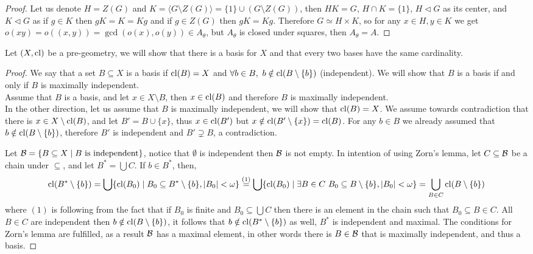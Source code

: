 \begin{proof}
	Let us denote $H = Z(G)$ and $K = \langle G \setminus Z(G) \rangle = \{ 1 \} \cup (G \setminus Z(G))$, then $H K = G$, $H \cap K = \{ 1 \}$, $H \triangleleft G$ as its center,
	and $K \triangleleft G$ as if $g \in K$ then $g K = K = K g$ and if $g \in Z(G)$ then $g K = K g$.
	Therefore $G \simeq H \times K$, so for any $x \in H, y \in K$ we get $o(x y) = o((x, y)) = \gcd(o(x), o(y)) \in A_{\theta}$, but $A_{\theta}$ is closed under squares, then $A_{\theta} = A$.
\end{proof}

\question{}
\subquestion{}
Let $(X, \operatorname{cl})$ be a pre-geometry,
we will show that there is a basis for $X$ and that every two bases have the same cardinality.
\begin{proof}
	We say that a set $B \subseteq X$ is a basis if $\operatorname{cl}(B) = X$ and $\forall b \in B,\ b \notin \operatorname{cl}(B \setminus \{ b \})$ (independent).
	We will show that $B$ is a basis if and only if $B$ is maximally independent. \\
	Assume that $B$ is a basis, and let $x \in X \setminus B$, then $x \in \operatorname{cl}(B)$ and therefore $B$ is maximally independent. \\
	In the other direction, let us assume that $B$ is maximally independent, we will show that $\operatorname{cl}(B) = X$.
	We assume towards contradiction that there is $x \in X \setminus \operatorname{cl}(B)$, and let $B' = B \cup \{ x \}$, thus $x \in \operatorname{cl}(B')$ but $x \notin \operatorname{cl}(B' \setminus \{ x \}) = \operatorname{cl}(B)$.
	For any $b \in B$ we already assumed that $b \notin \operatorname{cl}(B \setminus \{ b \})$, therefore $B'$ is independent and $B' \supsetneq B$, a contradiction.
	
	Let $\mathcal{B} = \{ B \subseteq X \mid B \text{ is independent} \}$, notice that $\emptyset$ is independent then $\mathcal{B}$ is not empty.
	In intention of using Zorn's lemma, let $C \subseteq \mathcal{B}$ be a chain under $\subseteq$, and let $B^* = \bigcup C$.
	If $b \in B^*$, then,
	\[
		\operatorname{cl}(B^* \setminus \{ b \})
		= \bigcup \{ \operatorname{cl}(B_0) \mid B_0 \subseteq B^* \setminus \{ b \}, |B_0| < \omega \}
		\overset{(1)}{=} \bigcup \{ \operatorname{cl}(B_0) \mid \exists B \in C\ B_0 \subseteq B \setminus \{ b \}, |B_0| < \omega \}
		= \bigcup_{B \in C} \operatorname{cl}(B \setminus \{ b \})
	\]
	where $(1)$ is following from the fact that if $B_0$ is finite and $B_0 \subseteq \bigcup C$ then there is an element in the chain such that $B_0 \subseteq B \in C$.
	All $B \in C$ are independent then $b \notin \operatorname{cl}(B \setminus \{ b \})$, it follows that $b \notin \operatorname{cl}(B^* \setminus \{ b \})$ as well, $B^*$ is independent and maximal.
	The conditions for Zorn's lemma are fulfilled, as a result $\mathcal{B}$ has a maximal element, in other words there is $B \in \mathcal{B}$ that is maximally independent, and thus a basis.


\end{proof}
